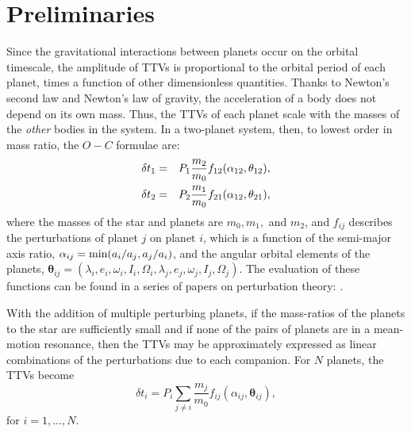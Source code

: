 \documentclass[graybox,natbib,nosecnum]{svmult}
\begin{document}
\section{Preliminaries}

Since the gravitational interactions between planets occur on the orbital timescale, the
amplitude of TTVs is proportional to the orbital period of each planet,
times a function of other dimensionless quantities.  Thanks to Newton's second law
and Newton's law of gravity, the acceleration of a body does not depend on its own mass.
Thus, the TTVs of each planet scale with the masses of the {\it other} bodies
in the system.
In a two-planet system, then, to lowest order in mass ratio, the $O-C$ formulae are: 
\begin{eqnarray}
\delta t_1 &=& P_1 \frac{m_2}{m_0} f_{12}(\alpha_{12},\mathbf{\theta}_{12}),\cr
\delta t_2 &=& P_2 \frac{m_1}{m_0} f_{21}(\alpha_{12},\mathbf{\theta}_{21}),
\end{eqnarray}
where the masses of the star and planets are $m_0, m_1,$ and $m_2$, and $f_{ij}$ describes the perturbations of planet $j$ on planet $i$,
which is a function of the semi-major axis ratio, $\alpha_{ij} = {\rm min}(a_i/a_j,a_j/a_i)$, and the angular orbital 
elements of the planets, $\mathbf{\theta}_{ij} = (\lambda_i,e_i,\omega_i,I_i,\Omega_i,\lambda_j,e_j,\omega_j,I_j,\Omega_j)$.  The evaluation of these functions can be found in a series of papers on perturbation theory: \cite{2008ApJ...688..636N, 2009ApJ...701.1116N,2010ApJ...709L..44N,2016ApJ...818..177A,2016ApJ...821...96D}.

With the addition of multiple perturbing planets, if the mass-ratios of the planets to the star are
sufficiently small and if none of the pairs of planets are in a mean-motion resonance, then the TTVs may be approximately expressed as linear combinations of the perturbations due to each companion.
For $N$ planets, the TTVs become
\begin{equation}
\delta t_i = P_i \sum_{j \ne i}  \frac{m_j}{m_0} f_{ij}(\alpha_{ij},\mathbf{\theta}_{ij}),
\end{equation}
for $i=1,...,N$.
\end{document}
